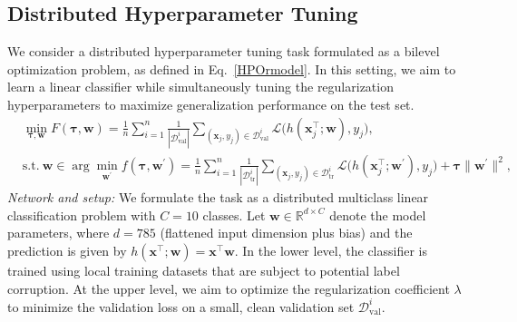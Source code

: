 \documentclass{article}
\theoremstyle{plain}
\theoremstyle{definition}
\theoremstyle{remark}
\begin{document}
\subsection{Distributed Hyperparameter Tuning} 
\label{app:details_hyper}



We consider a distributed hyperparameter tuning task formulated as a bilevel optimization problem, as defined in Eq.~\eqref{HPOrmodel}. 
In this setting, we aim to learn a linear classifier while simultaneously tuning the regularization hyperparameters to maximize generalization performance on the test set.
\begin{equation}\label{HPOrmodel}
	\begin{aligned}
		&\min_{\boldsymbol{\tau},\boldsymbol{w}}F(\boldsymbol{\tau},\boldsymbol{w})=\frac{1}{n}\sum_{i=1}^{n}\frac{1}{|\mathcal{D}_{\mathrm{val}}^{i}|}\sum_{(\mathbf{x}_{j},y_{j})\in\mathcal{D}_{\mathrm{val}}^{i}}\mathcal{L}\big(h(\mathbf{x}_{j}^{\top};\boldsymbol{w}),y_{j}\big), \\
		&\text{s.t.}\ \boldsymbol{w}\in\arg\min_{\boldsymbol{w}^{\prime}}f(\boldsymbol{\tau},\boldsymbol{w}^{\prime})=\frac{1}{n}\sum_{i=1}^{n}\frac{1}{|\mathcal{D}_{\mathrm{tr}}^{i}|}\sum_{(\mathbf{x}_{j},y_{j})\in\mathcal{D}_{\mathrm{tr}}^{i}}\mathcal{L}\big(h(\mathbf{x}_{j}^{\top};\boldsymbol{w}^{\prime}),y_{j}\big)+\boldsymbol{\tau}\|\boldsymbol{w}^{\prime}\|^{2},
	\end{aligned}
\end{equation}
\textit{Network and setup:}
We formulate the task as a distributed multiclass linear classification problem with $C=10$ classes.
Let $\boldsymbol{w} \in \mathbb{R}^{d \times C}$ denote the model parameters, where $d=785$ (flattened input dimension plus bias) and the prediction is given by $h(\mathbf{x}^{\top};\boldsymbol{w})=\mathbf{x}^\top \boldsymbol{w}$.
In the lower level, the classifier is trained using local training datasets that are subject to potential label corruption.
At the upper level, we aim to optimize the regularization coefficient $\lambda$ to minimize the validation loss on a small, clean validation set $\mathcal{D}^i_{\mathrm{val}}$.
\end{document}
